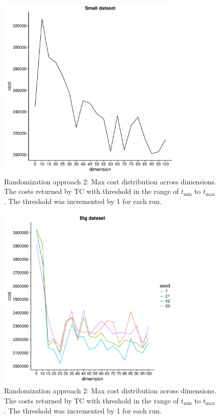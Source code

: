 \documentclass[a4paper,10pt]{article}
\theoremstyle{plain}
\theoremstyle{definition}
\begin{document}
\begin{figure}[H]
	\centering
	\includegraphics[width=0.8\textwidth]{./plots/plotCostsRandomSmallData-Ap2.pdf}
	\caption{Randomization approach 2: Max cost distribution across dimensions. The costs returned by TC with threshold in the range of $t_{\min}$ to $t_{\max}$. The threshold was incremented by 1 for each run.}
	\label{fig:plotCostsRandomSmallDataAp2}
\end{figure}

\begin{figure}[H]
	\centering
	\includegraphics[width=0.8\textwidth]{./plots/plotMaxCostRandomBig/plotCostsRandomBigData-Ap2.pdf}
	\caption{Randomization approach 2: Max cost distribution across dimensions. The costs returned by TC with threshold in the range of $t_{\min}$ to $t_{\max}$. The threshold was incremented by 1 for each run.}
	\label{fig:plotCostsRandomBigDataAp2}
\end{figure}
\end{document}
